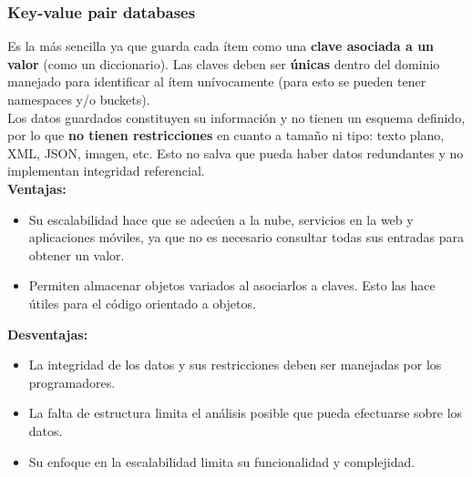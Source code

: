 \subsubsection*{Key-value pair databases}
Es la más sencilla ya que guarda cada ítem como una \textbf{clave asociada a un valor} (como un diccionario). Las claves deben ser \textbf{únicas} dentro del dominio manejado para identificar al ítem unívocamente (para esto se pueden tener namespaces y/o buckets). \\
Los datos guardados constituyen su información y no tienen un esquema definido, por lo que \textbf{no tienen restricciones} en cuanto a tamaño ni tipo: texto plano, XML, JSON, imagen, etc. Esto no salva que pueda haber datos redundantes y no implementan integridad referencial. \\
\textbf{Ventajas:}
\begin{itemize}
    \item Su escalabilidad hace que se adecúen a la nube, servicios en la web y aplicaciones móviles, ya que no es necesario consultar todas sus entradas para obtener un valor.
    \item Permiten almacenar objetos variados al asociarlos a claves. Esto las hace útiles para el código orientado a objetos.
\end{itemize}
\textbf{Desventajas:}
\begin{itemize}
    \item La integridad de los datos y sus restricciones deben ser manejadas por los programadores.
    \item La falta de estructura limita el análisis posible que pueda efectuarse sobre los datos.
    \item Su enfoque en la escalabilidad limita su funcionalidad y complejidad.
\end{itemize}

